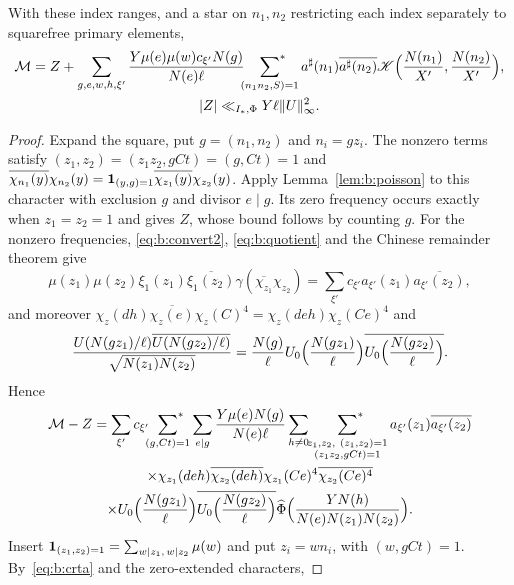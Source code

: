 \begin{lemma}\label{lem:b:secondpoisson}
With these index ranges, and a star on $n_1,n_2$ restricting each index separately to squarefree primary elements,
\begin{equation}\label{eq:b:secondpoisson}
  \begin{gathered}
  \mathcal M=Z+\sum_{g,e,w,h,\xi'}\frac{Y\mu(e)\mu(w)c_{\xi'}N(g)}{N(e)\ell}\sideset{}{^*}\sum_{(n_1n_2,S)=1}a^\sharp(n_1)\overline{a^\sharp(n_2)}\mathscr K\Bigl(\frac{N(n_1)}{X'},\frac{N(n_2)}{X'}\Bigr),\\
  |Z|\ll_{I_*,\Phi}Y\ell\|U\|_\infty^2.
  \end{gathered}
\end{equation}
\end{lemma}

\begin{proof}
Expand the square, put $g=(n_1,n_2)$ and $n_i=gz_i$. The nonzero terms satisfy $(z_1,z_2)=(z_1z_2,gCt)=(g,Ct)=1$ and $\overline{\chi_{n_1}(y)}\chi_{n_2}(y)=\mathbf{1}_{(y,g)=1}\overline{\chi_{z_1}(y)}\chi_{z_2}(y)$. Apply Lemma~\ref{lem:b:poisson} to this character with exclusion $g$ and divisor $e\mid g$. Its zero frequency occurs exactly when $z_1=z_2=1$ and gives $Z$, whose bound follows by counting $g$. For the nonzero frequencies, \eqref{eq:b:convert2}, \eqref{eq:b:quotient} and the Chinese remainder theorem give
\[
  \mu(z_1)\mu(z_2)\xi_1(z_1)\overline{\xi_1(z_2)}\gamma(\overline{\chi_{z_1}}\chi_{z_2})=\sum_{\xi'}c_{\xi'}a_{\xi'}(z_1)\overline{a_{\xi'}(z_2)},
\]
and moreover $\chi_z(dh)\overline{\chi_z(e)}\chi_z(C)^4=\chi_z(deh)\chi_z(Ce)^4$ and
\[
  \frac{U(N(gz_1)/\ell)\overline{U(N(gz_2)/\ell)}}{\sqrt{N(z_1)N(z_2)}}=\frac{N(g)}\ell U_0\Bigl(\frac{N(gz_1)}\ell\Bigr)\overline{U_0\Bigl(\frac{N(gz_2)}\ell\Bigr)}.
\]
Hence
\begin{multline*}
  \mathcal M-Z=\sum_{\xi'}c_{\xi'}\sfstar_{(g,Ct)=1}\sum_{e\mid g}\frac{Y\mu(e)N(g)}{N(e)\ell}\sum_{h\ne0}\sfstar_{\substack{z_1,z_2,\ (z_1,z_2)=1\\(z_1z_2,gCt)=1}}a_{\xi'}(z_1)\overline{a_{\xi'}(z_2)}\\
  \times\chi_{z_1}(deh)\overline{\chi_{z_2}(deh)}\chi_{z_1}(Ce)^4\overline{\chi_{z_2}(Ce)^4}\\
  \times U_0\Bigl(\frac{N(gz_1)}\ell\Bigr)\overline{U_0\Bigl(\frac{N(gz_2)}\ell\Bigr)}\widehat\Phi\Bigl(\frac{YN(h)}{N(e)N(z_1)N(z_2)}\Bigr).
\end{multline*}
Insert $\mathbf{1}_{(z_1,z_2)=1}=\sum_{w\mid z_1,\,w\mid z_2}\mu(w)$ and put $z_i=wn_i$, with $(w,gCt)=1$. By~\eqref{eq:b:crta} and the zero-extended characters,

\end{proof}
